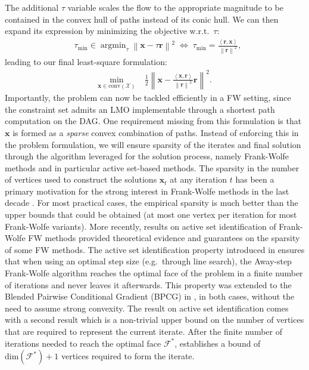 \documentclass{ecai}
\DeclareMathOperator*{\argmin}{argmin}
\newcommand{\innp}[2]{\left\langle #1, #2 \right\rangle}
\newcommand{\norm}[1]{\left\| #1 \right\|}
\newcommand{\vx}{\mathbf{x}}
\newcommand{\vr}{\mathbf{r}}
\newcommand{\Xset}{{\ensuremath{\mathcal{X}}}\xspace}
\begin{document}
The additional $\tau$ variable scales the flow to the appropriate magnitude to be contained in the convex hull of paths instead of its conic hull.
We can then expand its expression by minimizing the objective w.r.t.~$\tau$:
\begin{align*}
& \tau_{\min} \in \argmin_\tau \norm{\vx - \tau \vr}^2 \; \Leftrightarrow \; \tau_{\min} = \frac{\innp{\vr}{\vx}}{\norm{\vr}^{2}},
\end{align*}
leading to our final least-square formulation:
\begin{align*}
\min_{\vx \in \mathrm{conv}(\Xset{})}\;& \frac12 \norm{\vx - \frac{\innp{\vx}{\vr}}{\norm{\vr}^{2}} \vr }^2.
\end{align*}
Importantly, the problem can now be tackled efficiently in a FW setting, since the constraint set admits an LMO implementable through a shortest path computation on the DAG.
One requirement missing from this formulation is that $\vx$ is formed as a \emph{sparse} convex combination of paths.
Instead of enforcing this in the problem formulation, we will ensure sparsity of the iterates and final solution through the algorithm leveraged for the solution process, namely Frank-Wolfe methods and in particular active set-based methods.
The sparsity in the number of vertices used to construct the solutions $\vx_t$ at any iteration $t$ has been a primary motivation for the strong interest in Frank-Wolfe methods in the last decade \cite{jaggi2013revisiting,braun2022conditional}.
For most practical cases, the empirical sparsity is much better than the upper bounds that could be obtained (at most one vertex per iteration for most Frank-Wolfe variants).
More recently, results on active set identification of Frank-Wolfe FW methods provided theoretical evidence and guarantees on the sparsity of some FW methods.
The active set identification property introduced in \cite{bomze2020active} ensures that when using an optimal step size (e.g.~through line search), the Away-step Frank-Wolfe algorithm reaches the optimal face of the problem in a finite number of iterations and never leaves it afterwards.
This property was extended to the Blended Pairwise Conditional Gradient (BPCG) \cite{tsuji2022pairwise} in \cite{wirth2024pivoting}, in both cases, without the need to assume strong convexity.
The result on active set identification comes with a second result which is a non-trivial upper bound on the number of vertices that are required to represent the current iterate.
After the finite number of iterations needed to reach the optimal face $\mathcal{F}^*$, \cite{wirth2024pivoting} establishes a bound of $\mathrm{dim}(\mathcal{F}^*) + 1$ vertices required to form the iterate.
\end{document}
